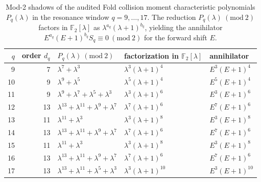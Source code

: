 \begin{table}[H]
\centering
\scriptsize
\setlength{\tabcolsep}{5pt}
\caption{Mod-2 shadows of the audited Fold collision moment characteristic polynomials $P_q(\lambda)$ in the resonance window $q=9,\dots,17$. The reduction $P_q(\lambda)\ (\mathrm{mod}\ 2)$ factors in $\mathbb{F}_2[\lambda]$ as $\lambda^{a_q}(\lambda+1)^{b_q}$, yielding the annihilator $E^{a_q}(E+1)^{b_q}S_q\equiv 0\ (\mathrm{mod}\ 2)$ for the forward shift $E$.}
\label{tab:fold_collision_charpoly_mod2_shadow_q9_17}
\begin{tabular}{r r l l l}
\toprule
$q$ & order $d_q$ & $P_q(\lambda)\ (\mathrm{mod}\ 2)$ & factorization in $\mathbb{F}_2[\lambda]$ & annihilator\\
\midrule
9 & 7 & $\lambda^{7} + \lambda^{3}$ & $\lambda^{3} \left(\lambda + 1\right)^{4}$ & $E^{3} \left(E + 1\right)^{4}$\\
10 & 9 & $\lambda^{9} + \lambda^{5}$ & $\lambda^{5} \left(\lambda + 1\right)^{4}$ & $E^{5} \left(E + 1\right)^{4}$\\
11 & 9 & $\lambda^{9} + \lambda^{7} + \lambda^{5} + \lambda^{3}$ & $\lambda^{3} \left(\lambda + 1\right)^{6}$ & $E^{3} \left(E + 1\right)^{6}$\\
12 & 13 & $\lambda^{13} + \lambda^{11} + \lambda^{9} + \lambda^{7}$ & $\lambda^{7} \left(\lambda + 1\right)^{6}$ & $E^{7} \left(E + 1\right)^{6}$\\
13 & 11 & $\lambda^{11} + \lambda^{3}$ & $\lambda^{3} \left(\lambda + 1\right)^{8}$ & $E^{3} \left(E + 1\right)^{8}$\\
14 & 13 & $\lambda^{13} + \lambda^{11} + \lambda^{9} + \lambda^{7}$ & $\lambda^{7} \left(\lambda + 1\right)^{6}$ & $E^{7} \left(E + 1\right)^{6}$\\
15 & 11 & $\lambda^{11} + \lambda^{3}$ & $\lambda^{3} \left(\lambda + 1\right)^{8}$ & $E^{3} \left(E + 1\right)^{8}$\\
16 & 13 & $\lambda^{13} + \lambda^{11} + \lambda^{9} + \lambda^{7}$ & $\lambda^{7} \left(\lambda + 1\right)^{6}$ & $E^{7} \left(E + 1\right)^{6}$\\
17 & 13 & $\lambda^{13} + \lambda^{11} + \lambda^{5} + \lambda^{3}$ & $\lambda^{3} \left(\lambda + 1\right)^{10}$ & $E^{3} \left(E + 1\right)^{10}$\\
\bottomrule
\end{tabular}
\end{table}
